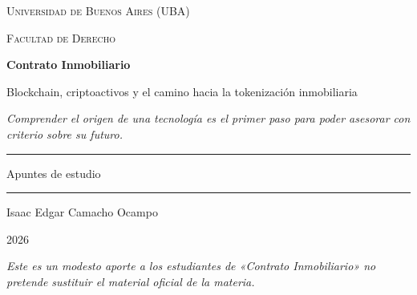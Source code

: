 \documentclass[12pt,oneside]{book}
\newcommand{\universidad}{Universidad de Buenos Aires (UBA)}
\newcommand{\facultad}{Facultad de Derecho}
\newcommand{\materia}{Contrato Inmobiliario}
\newcommand{\titulo}{Blockchain, criptoactivos y el camino hacia la tokenización inmobiliaria}
\newcommand{\autor}{Isaac Edgar Camacho Ocampo}
\newcommand{\anio}{2026}
\begin{document}
\begin{titlepage}
\thispagestyle{empty}

\begin{center}

\vspace*{1cm}

{\large \textsc{\universidad}}

\vspace{0.2cm}

{\large \textsc{\facultad}}

\vspace{3cm}

{\Huge \textbf{\materia}}

\vspace{1cm}

{\LARGE \titulo}

\vspace{0.8cm}

\textit{Comprender el origen de una tecnología es el primer paso para poder asesorar con criterio sobre su futuro.}

\vspace{1.2cm}

\rule{0.70\textwidth}{0.5pt}

\vspace{0.5cm}

{\large Apuntes de estudio}

\vspace{0.5cm}

\rule{0.70\textwidth}{0.5pt}

\vfill

{\large \autor}

\vspace{0.3cm}

{\large \anio}

\end{center}

\vfill

\begin{flushleft}
\textit{Este es un modesto aporte a los estudiantes de «Contrato Inmobiliario» no pretende sustituir el material oficial de la materia.}
\end{flushleft}

\end{titlepage}

\tableofcontents

\end{document}
